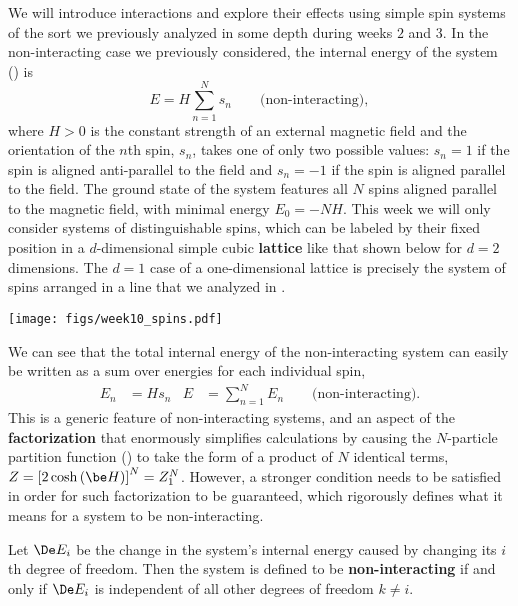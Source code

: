 We will introduce interactions and explore their effects using simple spin systems of the sort we previously analyzed in some depth during weeks $2$ and $3$.
In the non-interacting case we previously considered, the internal energy of the system () is
\begin{equation*}
  E = H \sum_{n = 1}^N s_n \qquad \mbox{(non-interacting)},
\end{equation*}
where $H > 0$ is the constant strength of an external magnetic field and the orientation of the $n$th spin, $s_n$, takes one of only two possible values: $s_n = 1$ if the spin is aligned anti-parallel to the field and $s_n = -1$ if the spin is aligned parallel to the field.
The ground state of the system features all $N$ spins aligned parallel to the magnetic field, with minimal energy $E_0 = -NH$.
This week we will only consider systems of distinguishable spins, which can be labeled by their fixed position in a $d$-dimensional simple cubic \textbf{lattice} like that shown below for $d = 2$ dimensions.
The $d = 1$ case of a one-dimensional lattice is precisely the system of spins arranged in a line that we analyzed in .

\begin{center}\texttt{[image: figs/week10\_spins.pdf]}\end{center}

We can see that the total internal energy of the non-interacting system can easily be written as a sum over energies for each individual spin,
\begin{align*}
  E_n & = H s_n &
  E & = \sum_{n = 1}^N E_n \qquad \mbox{(non-interacting)}.
\end{align*}
This is a generic feature of non-interacting systems, and an aspect of the \textbf{factorization} that enormously simplifies calculations by causing the $N$-particle partition function () to take the form of a product of $N$ identical terms, $Z = \left[2\cosh\left(\be H\right)\right]^N = Z_1^N$.
However, a stronger condition needs to be satisfied in order for such factorization to be guaranteed, which rigorously defines what it means for a system to be non-interacting.

\begin{shaded}
  Let $\De E_i$ be the change in the system's internal energy caused by changing its $i$th degree of freedom.
  Then the system is defined to be \textbf{non-interacting} if and only if $\De E_i$ is independent of all other degrees of freedom $k \ne i$.
\end{shaded}

